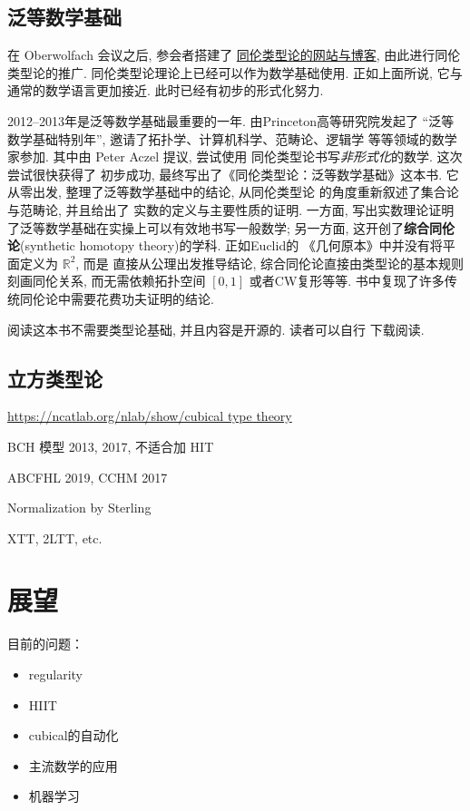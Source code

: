 \documentclass[UTF8]{ctexbook}
\theoremstyle{plain}
\theoremstyle{definition}
\theoremstyle{remark}
\begin{document}
\section{泛等数学基础}
在 Oberwolfach 会议之后, 参会者搭建了%
\href{http://homotopytypetheory.org/}{同伦类型论的网站与博客},
由此进行同伦类型论的推广.
同伦类型论理论上已经可以作为数学基础使用. 正如上面所说, 它与
通常的数学语言更加接近. 此时已经有初步的形式化努力.

2012--2013年是泛等数学基础最重要的一年. 由Princeton高等研究院发起了
“泛等数学基础特别年”, 邀请了拓扑学、计算机科学、范畴论、逻辑学
等等领域的数学家参加. 其中由 Peter Aczel 提议, 尝试使用
同伦类型论书写\emph{非形式化}的数学. 这次尝试很快获得了
初步成功, 最终写出了《同伦类型论：泛等数学基础》\cite{ufp:2013:hottbook}这本书.
它从零出发, 整理了泛等数学基础中的结论, 从同伦类型论
的角度重新叙述了集合论与范畴论, 并且给出了
实数的定义与主要性质的证明. 一方面, 写出实数理论证明
了泛等数学基础在实操上可以有效地书写一般数学; 另一方面,
这开创了\textbf{综合同伦论}(synthetic homotopy theory)的学科. 正如Euclid的
《几何原本》中并没有将平面定义为 \(\mathbb R^2\), 而是
直接从公理出发推导结论, 综合同伦论直接由类型论的基本规则
刻画同伦关系, 而无需依赖拓扑空间 \([0,1]\) 或者CW复形等等.
书中复现了许多传统同伦论中需要花费功夫证明的结论.

阅读这本书不需要类型论基础, 并且内容是开源的. 读者可以自行
下载阅读.

\section{立方类型论}


\url{https://ncatlab.org/nlab/show/cubical type theory}

BCH 模型 2013, 2017, 不适合加 HIT

ABCFHL 2019, CCHM 2017

Normalization by Sterling

XTT, 2LTT, etc.

\chapter{展望}
目前的问题：
\begin{itemize}
\item regularity
\item HIIT
\item cubical的自动化
\item 主流数学的应用
\item 机器学习
\end{itemize}

\printbibliography[title=参考文献]
\end{document}
